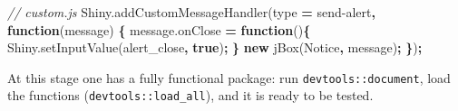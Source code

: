 \documentclass[
]{krantz}
\makeatletter
\newenvironment{Shaded}{\begin{snugshade}}{\end{snugshade}}
\newcommand{\AttributeTok}[1]{\textcolor[rgb]{0.61,0.61,0.61}{#1}}
\newcommand{\CommentTok}[1]{\textcolor[rgb]{0.37,0.37,0.37}{\textit{#1}}}
\newcommand{\ControlFlowTok}[1]{\textcolor[rgb]{0.27,0.27,0.27}{\textbf{#1}}}
\newcommand{\KeywordTok}[1]{\textcolor[rgb]{0.27,0.27,0.27}{\textbf{#1}}}
\newcommand{\NormalTok}[1]{#1}
\newcommand{\OperatorTok}[1]{\textcolor[rgb]{0.43,0.43,0.43}{\textbf{#1}}}
\newcommand{\StringTok}[1]{\textcolor[rgb]{0.5,0.5,0.5}{#1}}
\newcommand{\VariableTok}[1]{\textcolor[rgb]{0,0,0}{#1}}
\newenvironment{kframe}{%
\medskip{}
\setlength{\fboxsep}{.8em}
 \def\at@end@of@kframe{}%
 \ifinner\ifhmode%
  \def\at@end@of@kframe{\end{minipage}}%
  \begin{minipage}{\columnwidth}%
 \fi\fi%
 \def\FrameCommand##1{\hskip\@totalleftmargin \hskip-\fboxsep
 \colorbox{shadecolor}{##1}\hskip-\fboxsep
     \hskip-\linewidth \hskip-\@totalleftmargin \hskip\columnwidth}%
 \MakeFramed {\advance\hsize-\width
   \@totalleftmargin\z@ \linewidth\hsize
   \@setminipage}}%
 {\par\unskip\endMakeFramed%
 \at@end@of@kframe}
\renewenvironment{Shaded}{\begin{kframe}}{\end{kframe}}
\makeatother
\begin{document}
\begin{Shaded}
\begin{Highlighting}[]
\CommentTok{// custom.js}
\VariableTok{Shiny}\NormalTok{.}\AttributeTok{addCustomMessageHandler}\NormalTok{(type }\OperatorTok{=} \StringTok{\textquotesingle{}send{-}alert\textquotesingle{}}\OperatorTok{,} \KeywordTok{function}\NormalTok{(message) }\OperatorTok{\{}
  \VariableTok{message}\NormalTok{.}\AttributeTok{onClose} \OperatorTok{=} \KeywordTok{function}\NormalTok{()}\OperatorTok{\{}
    \VariableTok{Shiny}\NormalTok{.}\AttributeTok{setInputValue}\NormalTok{(}\StringTok{\textquotesingle{}alert\_close\textquotesingle{}}\OperatorTok{,} \KeywordTok{true}\NormalTok{)}\OperatorTok{;}
  \OperatorTok{\}}
  \KeywordTok{new} \AttributeTok{jBox}\NormalTok{(}\StringTok{\textquotesingle{}Notice\textquotesingle{}}\OperatorTok{,}\NormalTok{ message)}\OperatorTok{;}
\OperatorTok{\}}\NormalTok{)}\OperatorTok{;}
\end{Highlighting}
\end{Shaded}

At this stage one has a fully functional package: run \texttt{devtools::document}, load the functions (\texttt{devtools::load\_all}), and it is ready to be tested.

\begin{Shaded}
\end{Shaded}
\end{document}
